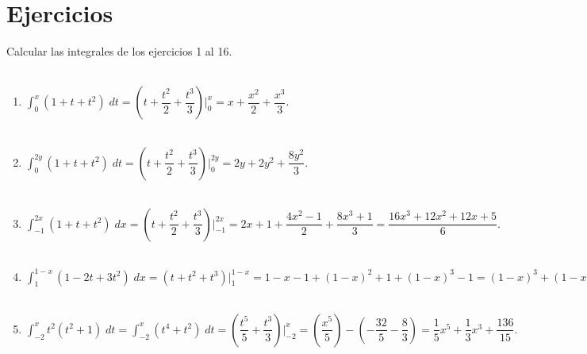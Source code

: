 \section{Ejercicios}

Calcular las integrales de los ejercicios 1 al 16.\\\\

\begin{enumerate}[\bfseries  1.]

    \item $\displaystyle\int_0^x (1+t+t^2)\; dt = \left(t+\dfrac{t^2}{2}+\dfrac{t^3}{3}\right)\bigg|_0^x = x+\dfrac{x^2}{2}+\dfrac{x^3}{3}.$\\\\

    \item $\displaystyle\int_0^{2y} (1+t+t^2)\; dt = \left(t+\dfrac{t^2}{2}+\dfrac{t^3}{3}\right)\bigg|_0^{2y} = 2y + 2y^2 + \dfrac{8y^2}{3}.$\\\\

    \item $\displaystyle\int_{-1}^{2x} (1+t+t^2)\; dx = \left(t+\dfrac{t^2}{2}+\dfrac{t^3}{3}\right)\bigg|_{-1}^{2x} = 2x+1 + \dfrac{4x^2 -1}{2} + \dfrac{8x^3 + 1}{3} = \dfrac{16x^3+12x^2+12x+5}{6}.$\\\\

    \item $\displaystyle\int_1^{1-x} (1-2t+3t^2)\; dx = \left(t + t^2 + t^3\right)\bigg|_1^{1-x} = 1-x - 1 + (1-x)^2 + 1 + (1-x)^3 - 1 = (1-x)^3 + (1-x)^2 + (1 - x) - 1 = -x^3 + 2x^2 - 2x$\\\\

    \item $\displaystyle\int_{-2}^{x}t^2(t^2+1)\; dt = \int_{-2}^x (t^4+t^2)\; dt = \left(\dfrac{t^5}{5}+\dfrac{t^3}{3}\right)\bigg|_{-2}^x = \left(\dfrac{x^5}{5}\right) - \left(-\dfrac{32}{5}-\dfrac{8}{3}\right) = \dfrac{1}{5}x^5+\dfrac{1}{3}x^3+\dfrac{136}{15}.$\\\\


\end{enumerate}
